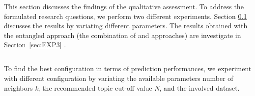 This section discusses the findings of the qualitative assessment. To address the formulated research questions, we perform two different experiments. Section \ref{sec:EXP1} discusses the \CT results by variating different parameters. %
The results obtained with the entangled approach (\ie the combination of \CT and \MNB approaches) are investigate in Section~\ref{sec:EXP3} . 


\subsection{\rqfirst} \label{sec:EXP1}
  
To find the best configuration in terms of prediction performances, we experiment with different \CT configuration by variating the available parameters \ie number of neighbors \emph{k}, the recommended topic cut-off value \emph{N}, and the involved dataset.   %


